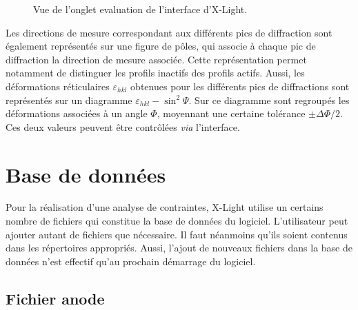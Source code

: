 \documentclass[french,a4paper]{report}
\begin{document}
\begin{figure}[bh!]
\centering
{}
\caption{Vue de l'onglet evaluation de l'interface d'X-Light.}
\label{fig_evaluate}
\end{figure}

Les directions de mesure correspondant aux différents pics de diffraction sont également représentés sur une figure de pôles, qui associe à chaque pic de diffraction la direction de mesure associée. Cette représentation permet notamment de distinguer les profils inactifs des profils actifs. Aussi, les déformations réticulaires $\varepsilon_{hkl}$ obtenues pour les différents pics de diffractions sont représentés sur un diagramme $\varepsilon_{hkl}-\sin^2 \Psi$. Sur ce diagramme sont regroupés les déformations associées à un angle $\Phi$, moyennant une certaine tolérance $\pm \Delta \Phi/2$. Ces deux valeurs peuvent être contrôlées \textit{via} l'interface.


\section{Base de données}

Pour la réalisation d'une analyse de contraintes, X-Light utilise un certains nombre de fichiers qui constitue la base de données du logiciel. L'utilisateur peut ajouter autant de fichiers que nécessaire. Il faut néanmoins qu'ils soient contenus dans les répertoires appropriés. Aussi, l'ajout de nouveaux fichiers dans la base de données n'est effectif qu'au prochain démarrage du logiciel.

\subsection{Fichier anode}
\end{document}
